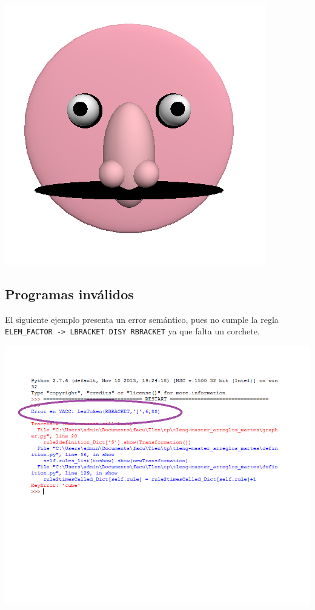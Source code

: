 

\centerline{\includegraphics[scale=0.40]{../imagenes/cara.png}}

\newpage

\subsection{Programas inv\'alidos}

El siguiente ejemplo presenta un error sem\'antico, pues no cumple la regla \texttt{ELEM\_FACTOR -> LBRACKET DISY RBRACKET} ya que falta un corchete. \\



\centerline{\includegraphics[scale=0.70]{../imagenes/eg22invalid.png}}


